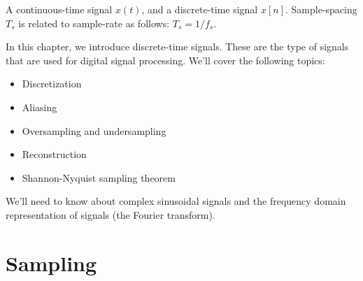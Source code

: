 \begin{marginfigure}
\begin{center}
\end{center}
\caption{A continuous-time signal $x(t)$, and a discrete-time signal
  $x[n]$. Sample-spacing $T_s$ is related to sample-rate as follows:
  $T_s = 1/f_s$.}

\end{marginfigure}
In this chapter, we introduce discrete-time signals. These are the
type of signals that are used for digital signal processing. We'll
cover the following topics:
\begin{itemize}
\item Discretization 
\item Aliasing
\item Oversampling and undersampling
\item Reconstruction
\item Shannon-Nyquist sampling theorem
\end{itemize}
We'll need to know about complex sinusoidal signals and the frequency
domain representation of signals (the Fourier transform).

\section{Sampling}

